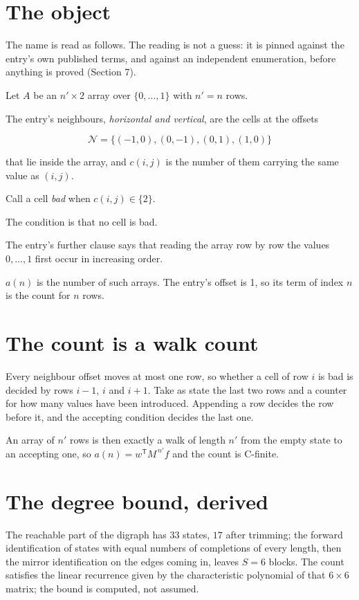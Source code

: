 \documentclass[11pt]{article}
\theoremstyle{definition}
\begin{document}
\section{The object}

The name is read as follows. The reading is not a guess: it is pinned against the entry's own published terms, and against an independent enumeration, before anything is proved (Section 7).

Let $A$ be an $n' \times 2$ array over $\{0,\dots,1\}$ with $n' = n$ rows.

The entry's neighbours, {\itshape horizontal and vertical}, are the cells at the offsets

\[\mathcal{N} = \{(-1,0), (0,-1), (0,1), (1,0)\}\]

that lie inside the array, and $c(i,j)$ is the number of them carrying the same value as $(i,j)$.

Call a cell {\itshape bad} when $c(i,j) \in \{2\}$.

The condition is that no cell is bad.

The entry's further clause says that reading the array row by row the values $0,\dots,1$ first occur in increasing order.

$a(n)$ is the number of such arrays. The entry's offset is 1, so its term of index $n$ is the count for $n$ rows.

\section{The count is a walk count}

Every neighbour offset moves at most one row, so whether a cell of row $i$ is bad is decided by rows $i-1$, $i$ and $i+1$. Take as state the last two rows and a counter for how many values have been introduced. Appending a row decides the row before it, and the accepting condition decides the last one.

An array of $n'$ rows is then exactly a walk of length $n'$ from the empty state to an accepting one, so $a(n) = w^{\mathsf T}M^{\,n'}f$ and the count is C-finite.

\section{The degree bound, derived}

The reachable part of the digraph has $33$ states, $17$ after trimming; the forward identification of states with equal numbers of completions of every length, then the mirror identification on the edges coming in, leaves $S = 6$ blocks. The count satisfies the linear recurrence given by the characteristic polynomial of that $6\times6$ matrix; the bound is computed, not assumed.
\end{document}
